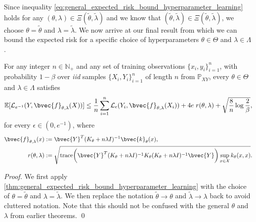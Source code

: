 \documentclass[runningheads, envcountsame, a4paper]{llncs}
\begin{document}
			Since inequality \eqref{eq:general_expected_risk_bound_hyperparameter_learning} holds for any $(\theta, \lambda) \in \Xi(\tilde{\theta}, \tilde{\lambda})$ and we know that $(\tilde{\theta}, \tilde{\lambda}) \in \Xi(\tilde{\theta}, \tilde{\lambda})$, we choose $\theta = \tilde{\theta}$ and $\lambda = \tilde{\lambda}$.  We now arrive at our final result from which we can bound the expected risk for a specific choice of hyperparameters $\theta \in \Theta$ and $\lambda \in \Lambda$.
			
			\begin{theorem}
				\label{thm:expected_risk_bound_hyperparameter_learning}
				For any integer $n \in \mathbb{N}_{+}$ and any set of training observations $\{x_{i}, y_{i}\}_{i = 1}^{n}$, with probability $1 - \beta$ over \textit{iid} samples $\{X_{i}, Y_{i}\}_{i = 1}^{n}$ of length $n$ from $\mathbb{P}_{X Y}$, every $\theta \in \Theta$ and $\lambda \in \Lambda$ satisfies
				\begin{equation}
					\mathbb{E}[\mathcal{L}_{e^{-1}}(Y, \bvec{f}_{\theta, \lambda}(X))] \leq \frac{1}{n} \sum_{i = 1}^{n} \mathcal{L}_{\epsilon}(Y_{i}, \bvec{f}_{\theta, \lambda}(X_{i})) + 4 e \; r(\theta, \lambda) + \sqrt{\frac{8}{n} \log{\frac{2}{\beta}}},
				\label{eq:expected_risk_bound_hyperparameter_learning}
				\end{equation}
				for every $\epsilon \in (0, e^{-1})$, where 
				\begin{equation}
				\begin{aligned}
					\bvec{f}_{\theta, \lambda}(x) &:= \bvec{Y}^{T} (K_{\theta} + n \lambda I)^{-1} \bvec{k}_{\theta}(x), \\
					r(\theta, \lambda) &:= \sqrt{\mathrm{trace}\bigg(\bvec{Y}^{T} (K_{\theta} + n \lambda I)^{-1} K_{\theta} (K_{\theta} + n \lambda I)^{-1} \bvec{Y}\bigg) \sup_{x \in \mathcal{X}} k_{\theta}(x, x)}.
				\end{aligned}
				\end{equation}
			\end{theorem}
			
			\begin{proof}
				We first apply \cref{thm:general_expected_risk_bound_hyperparameter_learning} with the choice of $\theta = \tilde{\theta}$ and $\lambda = \tilde{\lambda}$. We then replace the notation $\tilde{\theta} \rightarrow \theta$ and $\tilde{\lambda} \rightarrow \lambda$ back to avoid cluttered notation. Note that this should not be confused with the general $\theta$ and $\lambda$ from earlier theorems.
				\qed
			\end{proof}
	
\end{document}
